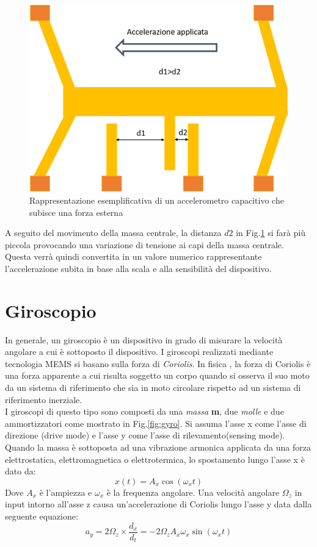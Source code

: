  \begin{figure}[H]  
	\centering 
	\includegraphics[scale=0.25 ]{tecnologie/acc2.png}
	\caption{Rappresentazione esemplificativa di un accelerometro capacitivo che subisce una forza esterna}
	\label{fig:acc2}
\end{figure}

A seguito del movimento della massa centrale, la distanza $d2$ in Fig.\ref{fig:acc2} si farà più piccola provocando una variazione di tensione ai capi della massa centrale. Questa verrà quindi convertita in un valore numerico rappresentante l'accelerazione subita in base alla scala e alla sensibilità del dispositivo.\\ 

\section{Giroscopio}
\label{giroscopi}
In generale, un giroscopio è un dispositivo in grado di misurare la velocità angolare a cui è sottoposto il dispositivo. I giroscopi realizzati mediante tecnologia MEMS si basano sulla forza di \textit{Coriolis}. In fisica \cite{corolois}, la forza di Coriolis è una forza apparente a cui risulta soggetto un corpo quando si osserva il suo moto da un sistema di riferimento che sia in moto circolare rispetto ad un sistema di riferimento inerziale. \\
I giroscopi di questo tipo sono composti \cite{gyroMems} da una \textit{massa} \textbf{m}, due \textit{molle} e due ammortizzatori come mostrato in Fig.\ref{fig:gyro}. Si assuma  l'asse x come l'asse di direzione (drive mode) e l'asse y come l'asse di rilevamento(sensing mode). Quando la massa è sottoposta ad una vibrazione armonica applicata da una forza elettrostatica, elettromagnetica o elettrotermica, lo spostamento lungo l'asse x è dato da:
\begin{equation}
x(t) = A_x \cos(\omega_x t)
\end{equation}
Dove $A_x$ è l'ampiezza e $\omega_x$ è la frequenza angolare.  Una velocità angolare $\Omega_z$ in input intorno all'asse z causa un'accelerazione di Coriolis lungo l'asse y data dalla seguente equazione:
\begin{equation}
a_y= 2\Omega_z \times \frac{d_x}{d_t}= -2\Omega_z A_x \omega_x \sin(\omega_x t)
\end{equation}

